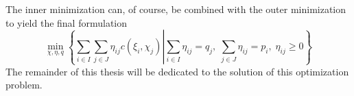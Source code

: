 The inner minimization can, of course, be combined with the outer minimization to yield the final formulation
\begin{equation}
  \label{eq:symbolic-optimization-with-minflow2}
  \min_{\chi,\eta,q}\left\{\sum_{i\in I}\sum_{j\in J}\eta_{ij}c(\xi_i,\chi_j)\left|\sum_{i\in I}\eta_{ij}=q_j,\;\sum_{j\in J}\eta_{ij}=p_i,\;\eta_{ij}\geq 0\right.\right\}
\end{equation}
The remainder of this thesis will be dedicated to the solution of this optimization problem.
\begin{comment}
\subsubsection{Tree Feasibility Sets}
\label{sec:tree-feas-sets}
In this section, the two feasibility sets $\mathcal{T}$ for scenario trees used in this paper are discussed.
These are the so called \textbf{discrete-event} trees and \textbf{continuous-event} trees.
The former are the model used in the prominent literature \cite{Dupacova2003} and related papers.
The notion of continuous-event trees is not discussed in any of the cited papers, but will prove to be a powerful concept.

A tree structure can be defined by the number of stages $n_s$ and the number of children (branches) $n_c$ to each node.
For a tree defined in that way, the number of scenarios in this tree (which is the same as the number of leaf nodes) is
\begin{equation}
  \label{eq:number-of-leaf-nodes}
  n_L = n_c^{n_s-1}.
\end{equation}
The number of nodes in the tree can be computed with the formula for the geometric series
\begin{equation}
  \label{eq:number-of-nodes}
  n_N = \frac{1-n_c^{n_s}}{1-n_c}
\end{equation}
\paragraph{Discrete-Event Trees} Consider a study on the robustness of a plane-based mail delivery system to cancellation of flights.
A large database of failures is available that can be used as data to form the initial stochastic process.
The next step is to generate a scenario tree from this data.
In order to evaluate the quality of a scenario tree, a metric for the space of all possible events is necessary.
This discrete space does not have a natural underlying metric space.
The metric must therefore be hand-crafted to fit this purpose.
For each pair of events, a \textbf{dissimilarity measure} must be provided.
Note that the tree generation algorithm will base its decision whether or not to aggregate scenarios o the values of the dissimilarity measure.
The modeling and optimization process therefore starts with this step.


\end{comment}
